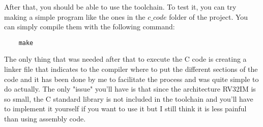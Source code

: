 After that, you should be able to use the toolchain. To test it, you can try making a simple program like the ones in the 
$c\_code$ folder of the project. You can simply compile them with the following command:

\begin{verbatim}
    make
\end{verbatim}


The only thing that was needed after that to execute the C code is creating a linker file that indicates to the compiler where 
to put the different sections of the code and it has been done by me to facilitate the process and was quite simple to do actually.
The only "issue" you'll have is that since the architecture RV32IM is so small, the C standard library is not included in the toolchain
and you'll have to implement it yourself if you want to use it but I still think it is less painful than using assembly code.\\